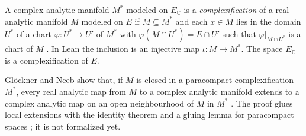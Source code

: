 \begin{definition}[Complexification]
  \label{def:complexification-manifold}
  \leanok
  A complex analytic manifold $M^*$ modeled on $E_{\mathbb{C}}$ is a \emph{complexification} of a real
  analytic manifold $M$ modeled on $E$ if $M \subseteq M^*$ and each $x \in M$ lies in the
  domain $U^*$ of a chart $\varphi \colon U^* \to U'$ of $M^*$ with
  $\varphi(M \cap U^*) = E \cap U'$ such that $\varphi|_{M \cap U^*}$ is a chart of $M$
  \cite[Definition~2.2.18]{GN26}. In Lean the inclusion is an injective map
  $\iota \colon M \to M^*$. The space $E_{\mathbb{C}}$ is a complexification of $E$.
\end{definition}

\begin{remark}
  \label{rem:complexification-extension}
  Glöckner and Neeb show that, if $M$ is closed in a paracompact complexification $M^*$, every
  real analytic map from $M$ to a complex analytic manifold extends to a complex analytic map on
  an open neighbourhood of $M$ in $M^*$ \cite[Proposition~2.2.19]{GN26}. The proof glues local
  extensions with the identity theorem and a gluing lemma for paracompact spaces
  \cite[Lemma~A.5.10]{GN26}; it is not formalized yet.
\end{remark}
